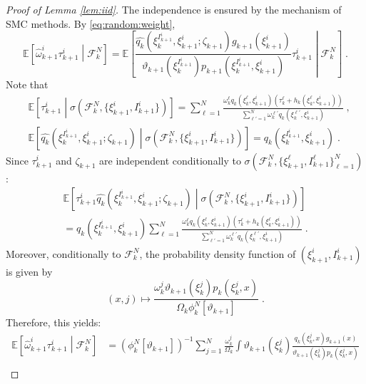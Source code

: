\documentclass[12pt]{article}
\newcommand{\eqsp}{\;}
\newcommand{\1}{\mathrm{1}}
\newcommand{\qk}{q_{k}}
\begin{document}
\begin{proof}[Proof of Lemma \ref{lem:iid}]
The independence is ensured by the mechanism of SMC methods. By \eqref{eq:random:weight},
\[
\mathbb{E}\left[\widehat{\omega}^i_{k+1}\tau^{i}_{k+1}\middle| \mathcal{F}_k^{N}\right] = \mathbb{E}\left[\frac{ \widehat{\qk}(\xi_{k}^{I^{i}_{k+1}}, \xi^{i}_{k+1};\zeta_{k+1})g_{k+1}(\xi^{i}_{k+1})}{\vartheta_{k+1}(\xi^{I^{i}_{k+1}}_{k}) p_{k+1}(\xi_{k}^{I^{i}_{k+1}},\xi^{i}_{k+1})}\tau^{i}_{k+1}\middle| \mathcal{F}_k^{N}\right]\eqsp.
\]
Note that
\begin{align*}
&\mathbb{E}\left[\tau^{i}_{k+1}\middle|\sigma\left(\mathcal{F}_k^{N},\{\xi_{k+1}^i,I_{k+1}^i\}\right)\right]
 = \sum_{\ell=1}^N\frac{\omega_k^{\ell} \qk(\xi_{k}^{\ell}, \xi^{i}_{k+1}) \left(\tau^{\ell}_k + h_{k}(\xi_{k}^{\ell},\xi^{i}_{k+1})\right)}{\sum_{\ell'=1}^N\omega_k^{\ell'} \qk(\xi_{k}^{\ell'},\xi^{i}_{k+1})}\eqsp,\\
&\mathbb{E} \left[\widehat{\qk}(\xi_{k}^{I^{i}_{k+1}},\xi^{i}_{k+1};\zeta_{k+1}) \middle| \sigma \left(\mathcal{F}_k^{N},\{\xi_{k+1}^i,I^{i}_{k+1}\}\right)\right]
 = \qk(\xi_{k}^{I^{i}_{k+1}},\xi^{i}_{k+1})\eqsp.
\end{align*}
Since $\tau^{i}_{k+1}$ and $\zeta_{k+1}$ are independent conditionally to $\sigma\left(\mathcal{F}_k^{N},\{\xi_{k+1}^{\ell}, I_{k+1}^{\ell}\}_{\ell=1}^N\right)$:
\begin{multline*}
\mathbb{E}\left[\tau^{i}_{k+1} \widehat{\qk} (\xi_{k}^{I^{i}_{k+1}},\xi^{i}_{k+1};\zeta_{k+1})\middle|\sigma\left(\mathcal{F}_k^{N},\{\xi_{k+1}^i,I_{k+1}^i\} \right)\right]\\
 = q_k(\xi_{k}^{I^{i}_{k+1}},\xi^{i}_{k+1})\sum_{\ell=1}^N\frac{\omega_k^{\ell} \qk (\xi_{k}^{\ell},\xi^{i}_{k+1})\left(\tau^{\ell}_k + h_{k}(\xi_{k}^{\ell},\xi^{i}_{k+1})\right)}{\sum_{\ell'=1}^N\omega_k^{\ell'} \qk (\xi_{k}^{\ell'},\xi^{i}_{k+1})}\eqsp.
\end{multline*}
Moreover, conditionally to $\mathcal{F}_k^N$, the probability density function of $(\xi_{k+1}^i,I_{k+1}^i)$ is given by
\[
(x,j) \mapsto \frac{\omega_k^j\vartheta_{k+1}(\xi_k^j)p_k(\xi_k^j,x)}{\Omega_k\phi_k^N[\vartheta_{k+1}]}\eqsp.
\]
Therefore, this yields:
\begin{align*}
\mathbb{E}\left[\widehat{\omega}^i_{k+1}\tau^{i}_{k+1}\middle| \mathcal{F}_k^{N}\right]&= \left(\phi^N_{k}[\vartheta_{k+1}]\right)^{-1} \sum_{j=1}^N\frac{\omega_k^j}{\Omega_k} \int \vartheta_{k+1}(\xi^{j}_{k})\frac{\qk(\xi_{k}^{j},x) g_{k+1}(x)}{\vartheta_{k+1}(\xi^{j}_{k}) p_{k}(\xi_{k}^{j},x)}\\

\end{align*}
\end{proof}
\end{document}
